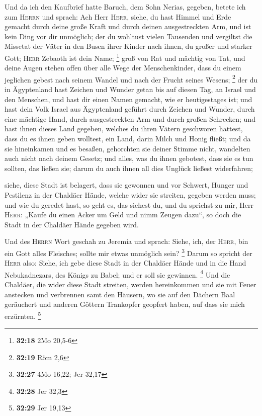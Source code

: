  Und da ich den Kaufbrief hatte Baruch, dem Sohn Nerias,
gegeben, betete ich zum \textsc{Herrn} und sprach:  Ach
Herr \textsc{Herr}, siehe, du hast Himmel und Erde gemacht durch deine
große Kraft und durch deinen ausgestreckten Arm, und ist kein Ding vor
dir unmöglich;  der du wohltust vielen Tausenden und
vergiltst die Missetat der Väter in den Busen ihrer Kinder nach ihnen,
du großer und starker Gott; \textsc{Herr} Zebaoth ist dein Name;
\footnote{\textbf{32:18} 2Mo 20,5-6}  groß von Rat und
mächtig von Tat, und deine Augen stehen offen über alle Wege der
Menschenkinder, dass du einem jeglichen gebest nach seinem Wandel und
nach der Frucht seines Wesens; \footnote{\textbf{32:19} Röm 2,6}
 der du in Ägyptenland hast Zeichen und Wunder getan bis
auf diesen Tag, an Israel und den Menschen, und hast dir einen Namen
gemacht, wie er heutigestages ist;  und hast dein Volk
Israel aus Ägyptenland geführt durch Zeichen und Wunder, durch eine
mächtige Hand, durch ausgestreckten Arm und durch großen Schrecken;
 und hast ihnen dieses Land gegeben, welches du ihren
Vätern geschworen hattest, dass du es ihnen geben wolltest, ein Land,
darin Milch und Honig fließt;  und da sie hineinkamen und
es besaßen, gehorchten sie deiner Stimme nicht, wandelten auch nicht
nach deinem Gesetz; und alles, was du ihnen gebotest, dass sie es tun
sollten, das ließen sie; darum du auch ihnen all dies Unglück ließest
widerfahren;

 siehe, diese Stadt ist belagert, dass sie gewonnen und
vor Schwert, Hunger und Pestilenz in der Chaldäer Hände, welche wider
sie streiten, gegeben werden muss; und wie du geredet hast, so geht es,
das siehest du,  und du sprichst zu mir, Herr
\textsc{Herr}: „Kaufe du einen Acker um Geld und nimm Zeugen dazu``, so
doch die Stadt in der Chaldäer Hände gegeben wird.

 Und des \textsc{Herrn} Wort geschah zu Jeremia und
sprach:  Siehe, ich, der \textsc{Herr}, bin ein Gott
alles Fleisches; sollte mir etwas unmöglich sein? \footnote{\textbf{32:27}
  4Mo 16,22; Jer 32,17}  Darum so spricht der
\textsc{Herr} also: Siehe, ich gebe diese Stadt in der Chaldäer Hände
und in die Hand Nebukadnezars, des Königs zu Babel; und er soll sie
gewinnen. \footnote{\textbf{32:28} Jer 32,3}  Und die
Chaldäer, die wider diese Stadt streiten, werden hereinkommen und sie
mit Feuer anstecken und verbrennen samt den Häusern, wo sie auf den
Dächern Baal geräuchert und anderen Göttern Trankopfer geopfert haben,
auf dass sie mich erzürnten. \footnote{\textbf{32:29} Jer 19,13}

